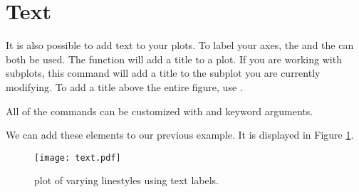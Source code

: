 \section*{Text} %

It is also possible to add text to your plots. 
To label your axes, the  and the  can both be used. 
The function  will add a title to a plot.
If you are working with subplots, this command will add a title to the subplot you are currently modifying.
To add a title above the entire figure, use .

All of the  commands can be customized with  and  keyword arguments. 

We can add these elements to our previous example. 
It is displayed in Figure \ref{text}.



\begin{figure}
\texttt{[image: text.pdf]}
\caption{plot of varying linestyles using text labels.}
\label{text} 
\end{figure}

